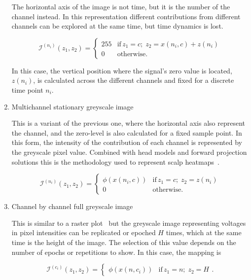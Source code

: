 \begin{enumerate}
The horizontal axis of the image is not time, but it is the number of the channel instead.   In this representation different contributions from different channels can be explored at the same time, but time dynamics is lost.  

\begin{equation}
\mathcal{I}^{(n_i)}(z_1,z_2) = \left\{ \begin{array}{rl}
255 & \text{if} \,  z_1 = c; \; z_2 =  x(n_i,c) + z(n_i) \\
0   & \mbox{otherwise}.
\end{array}\right.
\label{eq:image4}
\end{equation}

In this case, the vertical position where the signal's zero value is located, $z(n_i)$, is calculated across the different channels and fixed for a discrete time point $n_i$. 

\item Multichannel stationary greyscale image

This is a variant of the previous one, where the horizontal axis also represent the channel, and the zero-level is also calculated for a fixed sample point.   In this form, the intensity of the contribution of each channel is represented by the greyscale pixel value.  Combined with head models and forward projection solutions this is the methodology used to represent scalp heatmaps~\cite{Gramfort2013}.

\begin{equation}
\mathcal{I}^{(n_i)}(z_1,z_2)= \left\{ \begin{array}{rl}
\phi(x(n_i,c)) & \text{if} \,  z_1 = c; \; z_2 =  z(n_i) \\
0   & \mbox{otherwise}.
\end{array}\right.
\label{eq:image5}
\end{equation}


\item Channel by channel full greyscale image

This is similar to a raster plot~\cite{Cohen2014} but the greyscale image representing voltages in pixel intensities can be replicated or epoched $H$ times, which at the same time is the height of the image.  The selection of this value depends on the number of epochs or repetitions to show.  In this case, the mapping is

\begin{equation}
\mathcal{I}^{(c_i)}(z_1,z_2) = \left\{ \begin{array}{rl} \phi(x(n,c_i))  & \text{if} \,  z_1 = n; \; z_2 = H \end{array}\right. .
\label{eq:image6}
\end{equation}


\end{enumerate}


